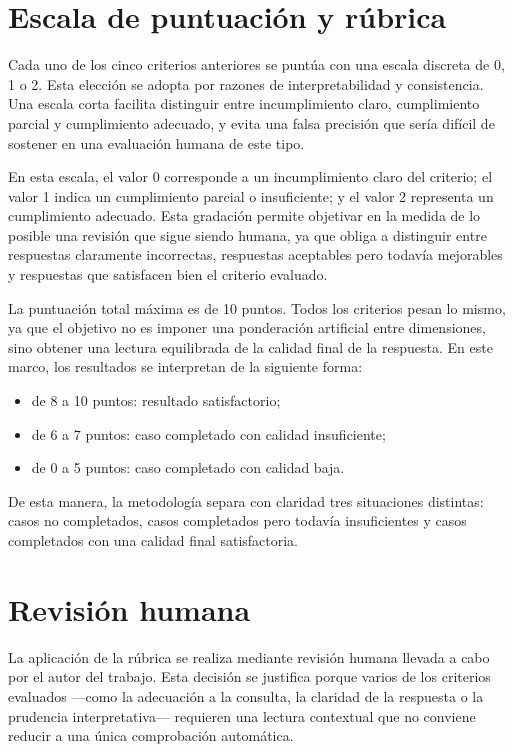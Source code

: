 \section{Escala de puntuaci\'on y r\'ubrica}

Cada uno de los cinco criterios anteriores se punt\'ua con una escala discreta de 0, 1 o 2. Esta elecci\'on se adopta por razones de interpretabilidad y
consistencia. Una escala corta facilita distinguir entre incumplimiento claro, cumplimiento parcial y cumplimiento adecuado, y evita una falsa precisi\'on que
ser\'ia dif\'icil de sostener en una evaluaci\'on humana de este tipo.

En esta escala, el valor 0 corresponde a un incumplimiento claro del criterio; el valor 1 indica un cumplimiento parcial o insuficiente; y el valor 2
representa un cumplimiento adecuado. Esta gradaci\'on permite objetivar en la medida de lo posible una revisi\'on que sigue siendo humana, ya que obliga a
distinguir entre respuestas claramente incorrectas, respuestas aceptables pero todav\'ia mejorables y respuestas que satisfacen bien el criterio evaluado.

La puntuaci\'on total m\'axima es de 10 puntos. Todos los criterios pesan lo mismo, ya que el objetivo no es imponer una ponderaci\'on artificial entre
dimensiones, sino obtener una lectura equilibrada de la calidad final de la respuesta. En este marco, los resultados se interpretan de la siguiente forma:

\begin{itemize}
    \item de 8 a 10 puntos: resultado satisfactorio;
    \item de 6 a 7 puntos: caso completado con calidad insuficiente;
    \item de 0 a 5 puntos: caso completado con calidad baja.
\end{itemize}

De esta manera, la metodolog\'ia separa con claridad tres situaciones distintas: casos no completados, casos completados pero todav\'ia insuficientes
y casos completados con una calidad final satisfactoria.

\section{Revisi\'on humana}

La aplicaci\'on de la r\'ubrica se realiza mediante revisi\'on humana llevada a cabo por el autor del trabajo. Esta decisi\'on se justifica porque varios de
los criterios evaluados ---como la adecuaci\'on a la consulta, la claridad de la respuesta o la prudencia interpretativa--- requieren una lectura contextual
que no conviene reducir a una \'unica comprobaci\'on autom\'atica.

